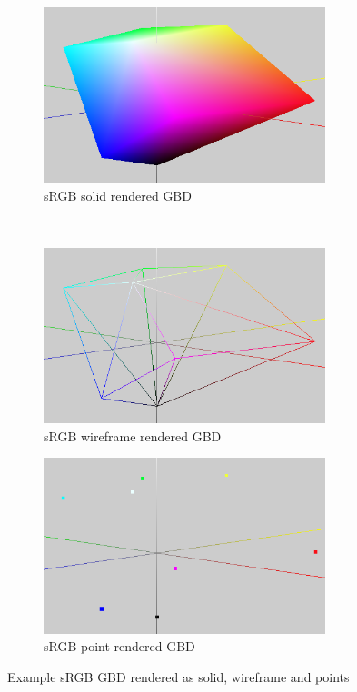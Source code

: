 \begin{figure}[H]
	\centering
	\begin{subfigure}[t]{0.5\textwidth}
		\centering
		\includegraphics[width=0.9\textwidth]{img/solid}
		\caption{sRGB solid rendered GBD}
	\end{subfigure}%
	~
	\begin{subfigure}[t]{0.5\textwidth}
		\centering
		\includegraphics[width=0.9\textwidth]{img/wire}
		\caption{sRGB wireframe rendered GBD}
	\end{subfigure}%

	\begin{subfigure}[t]{0.5\textwidth}
		\centering
		\includegraphics[width=0.9\textwidth]{img/points}
		\caption{sRGB point rendered GBD}
	\end{subfigure}
	\caption{Example sRGB GBD rendered as solid, wireframe and points}
	\label{fig:types}
\end{figure}

